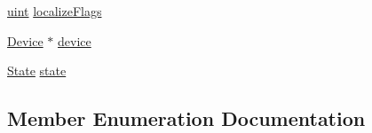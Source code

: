 \begin{DoxyCompactItemize}
\item 
\hyperlink{std__incl_8h_a91ad9478d81a7aaf2593e8d9c3d06a14}{uint} \hyperlink{struct_queued_c_u_d_a_tracker_1_1_stream_a70663b3059a1d37466919dfa495c8f62}{localize\+Flags}
\item 
\hyperlink{struct_queued_c_u_d_a_tracker_1_1_device}{Device} $\ast$ \hyperlink{struct_queued_c_u_d_a_tracker_1_1_stream_a91f103ae49b436de6aab96d34d7d0204}{device}
\item 
\hyperlink{struct_queued_c_u_d_a_tracker_1_1_stream_a836e14e096ea57bd153e812ce1e0a1f2}{State} \hyperlink{struct_queued_c_u_d_a_tracker_1_1_stream_ab609f91457378960151e374bd3d4f8c2}{state}
\end{DoxyCompactItemize}


\subsection{Member Enumeration Documentation}
